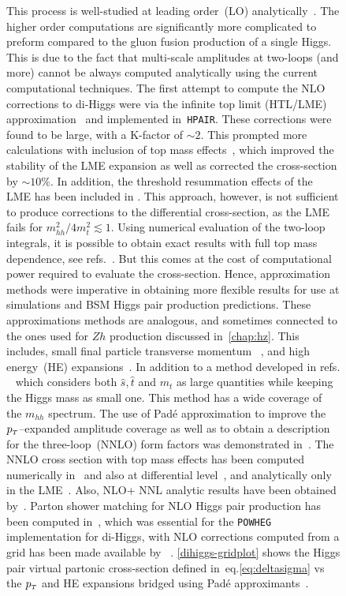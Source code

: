 \begin{figure}[!htpb]
This process is well-studied at leading order~(LO) analytically~\cite{EBOLI1987269,GLOVER1988282,DICUS1988457,Plehn:1996wb}.  The higher order computations are significantly more complicated to preform compared to the gluon fusion production of a single Higgs. This is due to the fact that multi-scale amplitudes at two-loops (and more) cannot be always computed analytically using the current computational techniques.  The first attempt to compute the NLO corrections to di-Higgs were via the infinite top limit (HTL/LME)  approximation~\cite{Dawson:1998py, Altenkamp:2012sx,Grigo:2014jma} and implemented in~\texttt{HPAIR}. These corrections were found to be large, with a K-factor of $ \sim 2$.  This prompted more calculations with inclusion of top mass effects~\cite{deFlorian:2013uza,Grigo:2013rya,Maltoni:2014eza,Grigo:2015dia,Degrassi:2016vss}, which improved the stability of the LME expansion as well as corrected the cross-section by $\sim 10\%$. In addition, the threshold resummation effects of the LME has been included in \cite{Shao:2013bz}. This approach, however, is not sufficient to produce corrections to the differential cross-section, as the LME fails for $m_{hh}^2/4m_t^2 \lesssim 1$. Using numerical evaluation of the two-loop integrals, it is possible to obtain exact results with full top mass dependence, see refs.~\cite{Borowka:2016ypz,Borowka:2016ehy,Baglio:2018lrj}. But this comes at the cost of computational power required to evaluate the cross-section.  Hence, approximation methods were imperative in obtaining more flexible results for use at simulations and BSM Higgs pair production predictions.  These approximations methods are analogous, and sometimes connected  to the ones used for $Zh$ production discussed in~\autoref{chap:hz}. This includes, small final particle transverse momentum ~\cite{Bonciani:2018omm}, and high energy~(HE) expansions~\cite{Davies:2018ood,Davies:2018qvx}. In addition to a method developed in refs. ~\cite{Xu:2018eos,Wang:2020nnr} which considers both $\hat s , \hat t$ and $m_t$ as large quantities while keeping the Higgs mass as small one. This method has a wide coverage of the $m_{hh}$ spectrum.  The use of Pad\'e approximation to improve the $p_{\scriptscriptstyle T}$--expanded amplitude coverage as well as to obtain a description for the three-loop~(NNLO) form factors was demonstrated in~\cite{Davies:2019nhm}. The NNLO cross section with top mass effects has been computed numerically in~\cite{Grazzini:2018bsd} and also at differential level~\cite{deFlorian:2016uhr}, and analytically only in the LME~\cite{deFlorian:2013jea}. Also, NLO+ NNL analytic results have been obtained by~\cite{deFlorian:2015moa}. Parton shower matching for NLO Higgs pair production has been computed  in~\cite{Jones:2017giv,Heinrich:2019bkc}, which was essential for the \texttt{POWHEG} implementation for di-Higgs, with NLO corrections computed from a grid has been made available by ~\cite{Heinrich:2017kxx,Heinrich:2019bkc,Heinrich:2020ckp}. \autoref{dihiggs-gridplot} shows the Higgs pair virtual partonic cross-section defined in~eq.\eqref{eq:deltasigma} vs the  $p_{\scriptscriptstyle T}$ and HE expansions bridged using Pad\'e  approximants~. \\

\end{figure}
